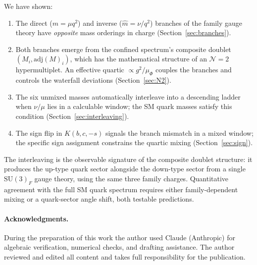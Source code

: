 \documentclass[preprint,12pt]{elsarticle}
\newcommand{\SU}{\mathrm{SU}}
\newcommand{\adj}{\mathrm{adj}}
\begin{document}
We have shown:
\begin{enumerate}
\item The direct ($m = \mu q^2$) and inverse ($\hat{m} = \nu/q^2$)
  branches of the family gauge theory have \emph{opposite}
  mass orderings in charge (Section~\ref{sec:branches}).
\item Both branches emerge from the confined spectrum's
  composite doublet $(M_i, \adj(M)_i)$, which has the
  mathematical structure of an $\mathcal{N}{=}2$
  hypermultiplet.  An effective quartic
  $\propto g^2/\mu_\Phi$ couples the branches
  and controls the waterfall deviations
  (Section~\ref{sec:N2}).
\item The six unmixed masses automatically interleave into a
  descending ladder when $\nu/\mu$ lies in a calculable
  window; the SM quark masses satisfy this condition
  (Section~\ref{sec:interleaving}).
\item The sign flip in $K(b,c,-s)$ signals the branch
  mismatch in a mixed window; the specific sign assignment
  constrains the quartic mixing
  (Section~\ref{sec:sign}).
\end{enumerate}
The interleaving is the observable signature of
the composite doublet structure: it produces the up-type
quark sector alongside the down-type sector from a single
$\SU(3)_F$ gauge theory, using the same three family charges.
Quantitative agreement with the full SM quark spectrum
requires either family-dependent mixing or a
quark-sector angle shift, both testable predictions.

\paragraph*{Acknowledgments.}
During the preparation of this work the author used Claude
(Anthropic) for algebraic verification, numerical checks,
and drafting assistance.
The author reviewed and edited all content and takes full
responsibility for the publication.
\end{document}
